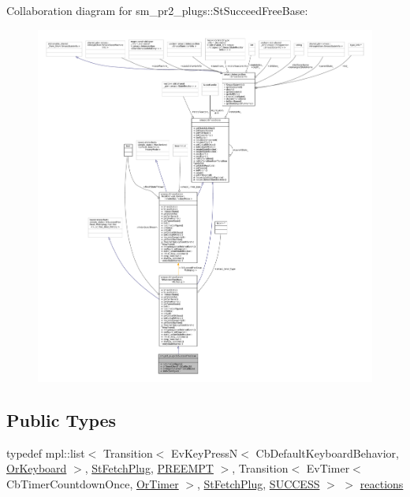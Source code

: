 Collaboration diagram for sm\+\_\+pr2\+\_\+plugs\+:\+:St\+Succeed\+Free\+Base\+:
\nopagebreak
\begin{figure}[H]
\begin{center}
\leavevmode
\includegraphics[width=350pt]{structsm__pr2__plugs_1_1StSucceedFreeBase__coll__graph}
\end{center}
\end{figure}
\subsection*{Public Types}
\begin{DoxyCompactItemize}
\item 
typedef mpl\+::list$<$ Transition$<$ Ev\+Key\+PressN$<$ Cb\+Default\+Keyboard\+Behavior, \hyperlink{classsm__pr2__plugs_1_1OrKeyboard}{Or\+Keyboard} $>$, \hyperlink{structsm__pr2__plugs_1_1StFetchPlug}{St\+Fetch\+Plug}, \hyperlink{classPREEMPT}{P\+R\+E\+E\+M\+PT} $>$, Transition$<$ Ev\+Timer$<$ Cb\+Timer\+Countdown\+Once, \hyperlink{classsm__pr2__plugs_1_1OrTimer}{Or\+Timer} $>$, \hyperlink{structsm__pr2__plugs_1_1StFetchPlug}{St\+Fetch\+Plug}, \hyperlink{classSUCCESS}{S\+U\+C\+C\+E\+SS} $>$ $>$ \hyperlink{structsm__pr2__plugs_1_1StSucceedFreeBase_a14771e3fa3c17d96f2b8c3f6f39089ec}{reactions}
\end{DoxyCompactItemize}
